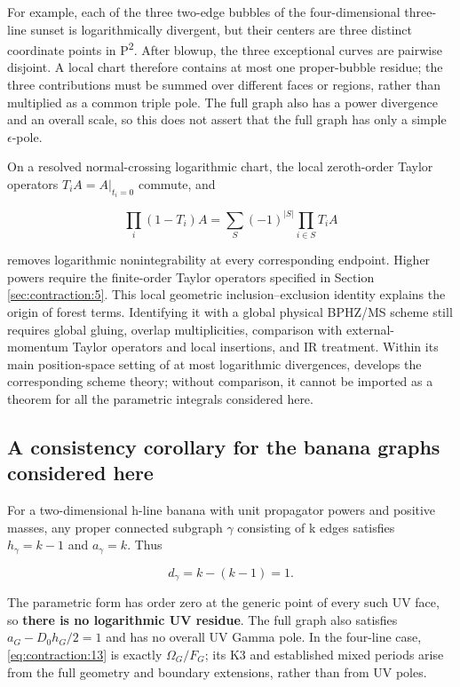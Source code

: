 \documentclass[11pt,a4paper,oneside]{article}
\theoremstyle{plain}
\theoremstyle{definition}
\theoremstyle{remark}
\numberwithin{equation}{section}
\begin{document}
For example, each of the three two-edge bubbles of the four-dimensional three-line sunset is logarithmically divergent, but their centers are three distinct coordinate points in P\textsuperscript{2}. After blowup, the three exceptional curves are pairwise disjoint. A local chart therefore contains at most one proper-bubble residue; the three contributions must be summed over different faces or regions, rather than multiplied as a common triple pole. The full graph also has a power divergence and an overall scale, so this does not assert that the full graph has only a simple \(\epsilon \)-pole.

On a resolved normal-crossing logarithmic chart, the local zeroth-order Taylor operators \(T_i A=A|_{t_i=0}\) commute, and

\begin{equation}
\prod_i(1-T_i)A=\sum_{S}(-1)^{|S|}\prod_{i\in S}T_i A          \label{eq:contraction:26}
\end{equation}

removes logarithmic nonintegrability at every corresponding endpoint. Higher powers require the finite-order Taylor operators specified in Section \ref{sec:contraction:5}. This local geometric inclusion--exclusion identity explains the origin of forest terms. Identifying it with a global physical BPHZ/MS scheme still requires global gluing, overlap multiplicities, comparison with external-momentum Taylor operators and local insertions, and IR treatment. Within its main position-space setting of at most logarithmic divergences, \cite{bbr} develops the corresponding scheme theory; without comparison, it cannot be imported as a theorem for all the parametric integrals considered here.


\subsection{A consistency corollary for the banana graphs considered here}\label{sec:contraction:8}

For a two-dimensional h-line banana with unit propagator powers and positive masses, any proper connected subgraph \(\gamma \) consisting of k edges satisfies \(h_\gamma =k- 1\) and \(a_\gamma =k\). Thus

\begin{equation}
d_\gamma=k-(k-1)=1.                \label{eq:contraction:27}
\end{equation}

The parametric form has order zero at the generic point of every such UV face, so \textbf{there is no logarithmic UV residue}. The full graph also satisfies \(a_G- D_0h_G/2=1\) and has no overall UV Gamma pole. In the four-line case, \eqref{eq:contraction:13} is exactly \(\Omega _G/F_G\); its K3 and established mixed periods arise from the full geometry and boundary extensions, rather than from UV poles.
\end{document}
